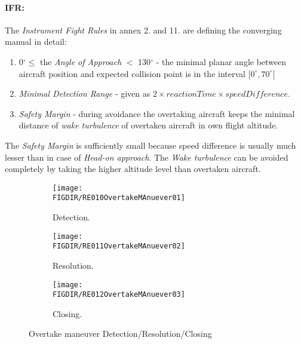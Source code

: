 \paragraph{IFR:} The \emph{Instrument Fight Rules} in annex 2. \cite{icaoAnnex2} and 11. \cite{icaoAnnex11} are defining the converging manual in detail:

\begin{enumerate}
    \item 0$^\circ \le$ the \emph{Angle of Approach} $<$ 130$^\circ$ - the minimal planar angle between aircraft position and expected collision point is in the interval $[0^\circ,70^\circ[$
    
    \item \emph{Minimal Detection Range} - given as $2 \times  reaction Time \times speed Difference$. 
    
    \item \emph{Safety Margin} - during avoidance the overtaking aircraft keeps the minimal distance of \emph{wake turbulence} of overtaken aircraft in own flight altitude. 
\end{enumerate}

\begin{note}
    The \emph{Safety Margin} is sufficiently small because speed difference is usually much lesser than in case of  \emph{Head-on approach}. The \emph{Wake turbulence} can be avoided completely by taking the higher altitude level than overtaken aircraft.
\end{note}



\begin{figure}[H]
	\centering
    \begin{subfigure}{0.32\textwidth}
        \texttt{[image: \\FIGDIR/RE010OvertakeMAnuever01]} 
        \caption{Detection.}
        \label{fig:OvertakeManeuverTheoreticalDetection}
    \end{subfigure}
    \begin{subfigure}{0.32\textwidth}
        \texttt{[image: \\FIGDIR/RE011OvertakeMAnuever02]} 
        \caption{Resolution.}
        \label{fig:OvertakeManeuverTheoreticalResolution}
    \end{subfigure}
    \begin{subfigure}{0.32\textwidth}
        \texttt{[image: \\FIGDIR/RE012OvertakeMAnuever03]} 
        \caption{Closing.}
        \label{fig:OvertakeManeuverTheoreticalClosure}
    \end{subfigure}
    \caption{Overtake maneuver Detection/Resolution/Closing}
    \label{fig:OvertakeManeuverTheoretical}
\end{figure}

